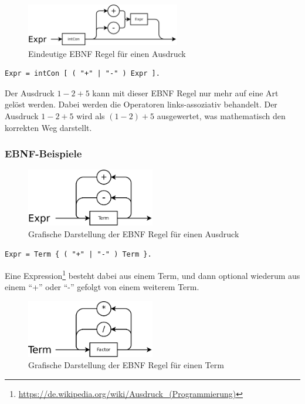
\begin{figure}[h]
\centering
\includegraphics[width=0.6\textwidth]{./media/images/compiler/ambiguity_correct.png}
\caption{Eindeutige EBNF Regel f\"ur einen Ausdruck}
\label{compiler_ambiguity_correct}
\end{figure}

\begin{lstlisting}[language=EBNF]
Expr = intCon [ ( "+" | "-" ) Expr ].
\end{lstlisting}

Der Ausdruck $1-2+5$ kann mit dieser EBNF Regel nur mehr auf eine Art gelöst werden. Dabei werden die Operatoren links-assoziativ behandelt. Der Ausdruck $1-2+5$ wird als $(1-2)+5$ ausgewertet, was mathematisch den korrekten Weg darstellt.

\subsubsection{EBNF-Beispiele}

\begin{figure}[h]
\centering
\includegraphics[width=0.5\textwidth]{./media/images/compiler/ebnf_expr.png}
\caption{Grafische Darstellung der EBNF Regel f\"ur einen Ausdruck}
\label{compiler_ebnf_expr}
\end{figure}

\begin{lstlisting}[language=EBNF]
Expr = Term { ( "+" | "-" ) Term }.
\end{lstlisting}

Eine Expression\footnote{\url{https://de.wikipedia.org/wiki/Ausdruck_(Programmierung)}} besteht dabei aus einem Term, und dann optional wiederum aus einem ``+'' oder ``-'' gefolgt von einem weiterem Term.

\begin{figure}[h]
\centering
\includegraphics[width=0.5\textwidth]{./media/images/compiler/ebnf_term.png}
\caption{Grafische Darstellung der EBNF Regel f\"ur einen Term}
\label{compiler_ebnf_term}
\end{figure}

